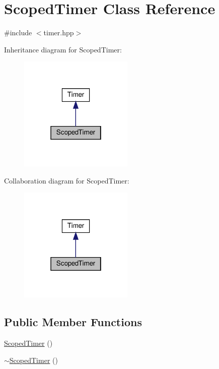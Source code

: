 \hypertarget{class_scoped_timer}{}\section{Scoped\+Timer Class Reference}
\label{class_scoped_timer}


{\ttfamily \#include $<$timer.\+hpp$>$}



Inheritance diagram for Scoped\+Timer\+:
\nopagebreak
\begin{figure}[H]
\begin{center}
\leavevmode
\includegraphics[width=154pt]{class_scoped_timer__inherit__graph}
\end{center}
\end{figure}


Collaboration diagram for Scoped\+Timer\+:
\nopagebreak
\begin{figure}[H]
\begin{center}
\leavevmode
\includegraphics[width=154pt]{class_scoped_timer__coll__graph}
\end{center}
\end{figure}
\subsection*{Public Member Functions}
\begin{DoxyCompactItemize}
\item 
\hyperlink{class_scoped_timer_a7bc7d8cca2444b07382d565b321d1f82}{Scoped\+Timer} ()
\item 
\hyperlink{class_scoped_timer_a338ced0c8c39fe3d3e89e1b09d29f589}{$\sim$\+Scoped\+Timer} ()
\end{DoxyCompactItemize}


